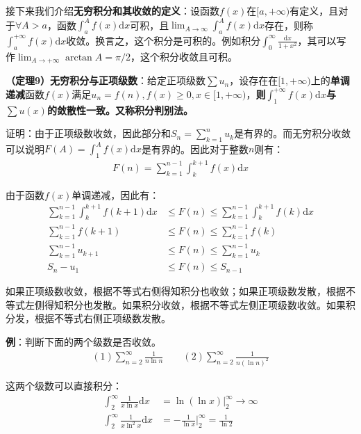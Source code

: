 \documentclass{ctexart}
\let\oldtextbf\textbf
\renewcommand{\textbf}[1]{\textcolor{brown!50!red}{\oldtextbf{#1}}}
\begin{document}
接下来我们介绍\textbf{\color{brown!50!red}无穷积分和其收敛的定义}：设函数$f(x)$在$[a,+\infty)$有定义，且对于$\forall A>a$，函数$\int_a^A f(x)\mathrm{d}x$可积，且$\lim_{A\to\infty}\int_a^A f(x)\mathrm{d}x$存在，则称$\int_a^{+\infty}f(x)\mathrm{d}x$收敛。换言之，这个积分是可积的。例如积分$\int_0^\infty \frac{\mathrm{d}x
}{1+x^2}$，其可以写作$\lim_{A\to+\infty}\arctan A=\pi/2$，这个积分收敛且可积。
\begin{tcolorbox}[
    colback=bac2,     %
    colframe=fra2,   %
    coltitle=white,             %
    coltext=tex2,
    title=无穷积分与正项级数敛散关系,
    fonttitle=\bfseries,        %
arc=3mm,                     %
breakable
]
\textbf{\color{brown!50!red}（定理9）无穷积分与正项级数}：给定正项级数$\sum u_n$，设存在在$[1,+\infty)$上的\textbf{\color{brown!50!red}单调递减}函数$f(x)$满足$u_n=f(n),f(x)\geq 0,x\in[1,+\infty)$，\textbf{\color{brown!50!red}则$\int_1^{+\infty}f(x)\mathrm{d}x$与$\sum u(x)$的敛散性一致。又称积分判别法。}
\end{tcolorbox}

证明：由于正项级数收敛，因此部分和$S_n=\sum_{k=1}^nu_k$是有界的。而无穷积分收敛可以说明$F(A)=\int_1^Af(x)\mathrm{d}x$是有界的。因此对于整数$n$则有：
\begin{align*}
 F(n)=\sum_{k=1}^{n-1}\int_k^{k+1}f(x)\mathrm{d}x
\end{align*}

由于函数$f(x)$单调递减，因此有：
\begin{align*}
 \sum_{k=1}^{n-1}\int_k^{k+1}f(k+1)\mathrm{d}x&\leq F(n)\leq\sum_{k=1}^{n-1}\int_k^{k+1}f(k)\mathrm{d}x\\
\sum_{k=1}^{n-1}f(k+1)&\leq F(n)\leq \sum_{k=1}^{n-1}f(k)\\
\sum_{k=1}^{n-1}u_{k+1}&\leq F(n)\leq\sum_{k=1}^{n-1}u_{k}\\
S_n-u_1&\leq F(n)\leq S_{n-1}
\end{align*}

如果正项级数收敛，根据不等式右侧得知积分也收敛；如果正项级数发散，根据不等式左侧得知积分也发散。如果积分收敛，根据不等式左侧正项级数收敛。如果积分发，根据不等式右侧正项级数发散。

\textbf{\color{brown!50!red}例}：判断下面的两个级数是否收敛。
\begin{align*}
    (1)\sum_{n=2}^\infty \frac{1}{n\ln n}\qquad (2)\sum_{n=2}^\infty \frac{1}{n(\ln n)^2}
\end{align*}

这两个级数可以直接积分：
\begin{align*}
    \int_2^\infty \frac{1}{x\ln x}\mathrm{d}x&=\ln(\ln x)|_2^\infty\to\infty\\
    \int_2^\infty \frac{1}{x\ln^2 x}\mathrm{d}x&=-\frac{1}{\ln x}|_2^\infty=\frac{1}{\ln 2}
\end{align*}
\end{document}
